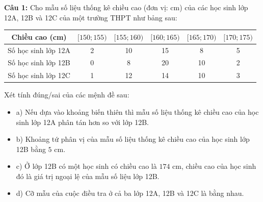 \documentclass[12pt]{article}
\begin{document}
	\noindent \textbf{Câu 1:} Cho mẫu số liệu thống kê chiều cao (đơn vị: cm) của các học sinh lớp 12A, 12B và 12C của một trường THPT như bảng sau:
	\begin{center}
		\renewcommand{\arraystretch}{1.3}
		\begin{tabular}{|c|c|c|c|c|c|}
			\hline
			Chiều cao (cm) & $[150; 155)$ & $[155; 160)$ & $[160; 165)$ & $[165; 170)$ & $[170; 175)$ \\
			\hline
			Số học sinh lớp 12A & 2 & 10 & 15 & 8 & 5 \\
			\hline
			Số học sinh lớp 12B & 0 & 8 & 20 & 10 & 2 \\
			\hline
			Số học sinh lớp 12C & 1 & 12 & 14 & 10 & 3 \\
			\hline
		\end{tabular}
	\end{center}
	Xét tính đúng/sai của các mệnh đề sau:
	\begin{itemize}[label=, leftmargin=*]
		\item  a) Nếu dựa vào khoảng biến thiên thì mẫu số liệu thống kê chiều cao của học sinh lớp 12A phân tán hơn so với lớp 12B.
		\item  b) Khoảng tứ phân vị của mẫu số liệu thống kê chiều cao của học sinh lớp 12B bằng $5\text{ cm}$.
		\item  c) Ở lớp 12B có một học sinh có chiều cao là $174\text{ cm}$, chiều cao của học sinh đó là giá trị ngoại lệ của mẫu số liệu lớp 12B.
		\item  d) Cỡ mẫu của cuộc điều tra ở cả ba lớp 12A, 12B và 12C là bằng nhau.
	\end{itemize}
	
	\vspace{4mm}
	
\end{document}
